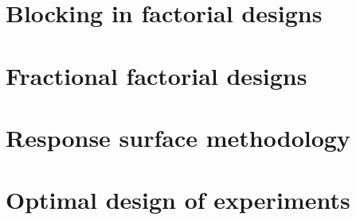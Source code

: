 \documentclass[
]{book}
\theoremstyle{definition}
\theoremstyle{definition}
\theoremstyle{definition}
\theoremstyle{definition}
\theoremstyle{remark}
\begin{document}
\hypertarget{blocking-in-factorial-designs}{%
\chapter{Blocking in factorial designs}\label{blocking-in-factorial-designs}}

\hypertarget{fractional-factorial-designs}{%
\chapter{Fractional factorial designs}\label{fractional-factorial-designs}}

\hypertarget{response-surface-methodology}{%
\chapter{Response surface methodology}\label{response-surface-methodology}}

\hypertarget{optimal-design-of-experiments}{%
\chapter{Optimal design of experiments}\label{optimal-design-of-experiments}}

  
\end{document}
